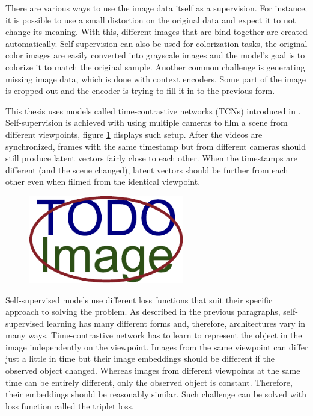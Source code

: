 There are various ways to use the image data itself as a supervision. For instance, it is possible to use a small distortion on the original data and expect it to not change its meaning. With this, different images that are bind together are created automatically. Self-supervision can also be used for colorization tasks, the original color images are easily converted into grayscale images and the model's goal is to colorize it to match the original sample. Another common challenge is generating missing image data, which is done with context encoders. Some part of the image is cropped out and the encoder is trying to fill it in to the previous form.

This thesis uses models called time-contrastive networks (TCNs) introduced in \cite{sermanet2018timecontrastive}. Self-supervision is achieved with using multiple cameras to film a scene from different viewpoints, figure \ref{fig:multiple-viewpoints} displays such setup. After the videos are synchronized, frames with the same timestamp but from different cameras should still produce latent vectors fairly close to each other. When the timestamps are different (and the scene changed), latent vectors should be further from each other even when filmed from the identical viewpoint.

\begin{figure}[ht]\centering
    \centering
    \includegraphics[width=0.5\linewidth,height=1.5in]{figures/placeholder.pdf}
    \caption{}
    \label{fig:multiple-viewpoints}
\end{figure}

Self-supervised models use different loss functions that suit their specific approach to solving the problem. As described in the previous paragraphs, self-supervised learning has many different forms and, therefore, architectures vary in many ways. Time-contrastive network has to learn to represent the object in the image independently on the viewpoint. Images from the same viewpoint can differ just a little in time but their image embeddings should be different if the observed object changed. Whereas images from different viewpoints at the same time can be entirely different, only the observed object is constant. Therefore, their embeddings should be reasonably similar. Such challenge can be solved with loss function called the triplet loss.

